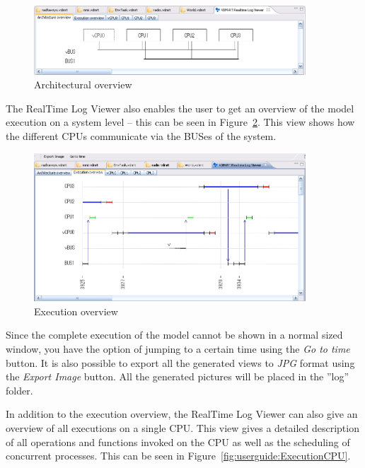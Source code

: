 \begin{figure}[htp]
\begin{center}
  \includegraphics[width=4in]{figures/ArchitectureOverview}
  \caption{Architectural overview}
  \label{fig:userguide:ArchitecturalOverview}
\end{center}
\end{figure}

The RealTime Log Viewer also enables the user to get an overview of
the model execution on a system level -- this can be seen in
Figure~\ref{fig:userguide:ExecutionOverview}. This view shows how the
different CPUs communicate via the BUSes of the system.

\begin{figure}[htp]
\begin{center}
  \includegraphics[width=4in]{figures/ExecutionOverview}
  \caption{Execution overview}
  \label{fig:userguide:ExecutionOverview}
\end{center}
\end{figure}

Since the complete execution of the model cannot be shown in a normal
sized window, you have the option of jumping to a certain time
using the \emph{Go to time} button. It is also possible to export all
the generated views to \emph{JPG} format using the \emph{Export Image}
button. All the generated pictures will be placed in the ''log''
folder.

In addition to the execution overview, the RealTime Log Viewer can
also give an overview of all executions on a single CPU. This view
gives a detailed description of all operations and functions invoked
on the CPU as well as the scheduling of concurrent processes. This can
be seen in Figure~\ref{fig:userguide:ExecutionCPU}.

